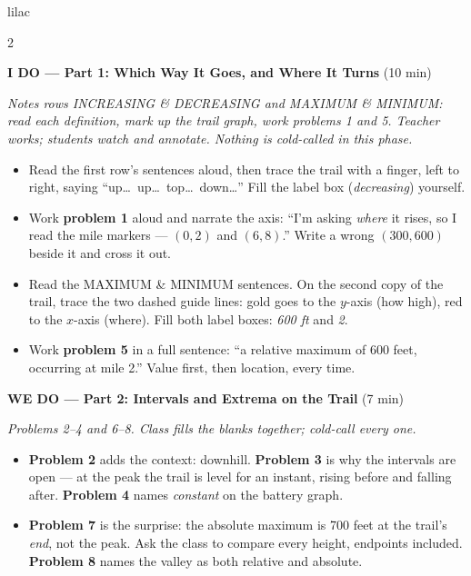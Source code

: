 \documentclass[10pt]{article}
\begin{document}
\begin{skillbox}{lilac}
\begin{multicols}{2}

\textbf{I DO --- Part 1: Which Way It Goes, and Where It Turns} (10 min)

\textit{Notes rows INCREASING \& DECREASING and MAXIMUM \& MINIMUM: read each definition, mark
up the trail graph, work problems 1 and 5. Teacher works; students watch and annotate. Nothing
is cold-called in this phase.}
\begin{itemize}
  \item Read the first row's sentences aloud, then trace the trail with a finger, left to right,
        saying ``up\ldots\ up\ldots\ top\ldots\ down\ldots'' Fill the label box
        (\textit{decreasing}) yourself.
  \item Work \textbf{problem 1} aloud and narrate the axis: ``I'm asking \emph{where} it rises,
        so I read the mile markers --- $(0, 2)$ and $(6, 8)$.'' Write a wrong
        $(300, 600)$ beside it and cross it out.
  \item Read the MAXIMUM \& MINIMUM sentences. On the second copy of the trail, trace the two
        dashed guide lines: gold goes to the $y$-axis (how high), red to the $x$-axis (where).
        Fill both label boxes: \textit{600 ft} and \textit{2}.
  \item Work \textbf{problem 5} in a full sentence: ``a relative maximum of 600 feet, occurring
        at mile 2.'' Value first, then location, every time.
\end{itemize}

\textbf{WE DO --- Part 2: Intervals and Extrema on the Trail} (7 min)

\textit{Problems 2--4 and 6--8. Class fills the blanks together; cold-call every one.}
\begin{itemize}
  \item \textbf{Problem 2} adds the context: downhill. \textbf{Problem 3} is why the intervals
        are open --- at the peak the trail is level for an instant, rising before and falling
        after. \textbf{Problem 4} names \textit{constant} on the battery graph.
  \item \textbf{Problem 7} is the surprise: the absolute maximum is 700 feet at the trail's
        \emph{end}, not the peak. Ask the class to compare every height, endpoints included.
        \textbf{Problem 8} names the valley as both relative and absolute.
\end{itemize}


\end{multicols}
\end{skillbox}
\end{document}
